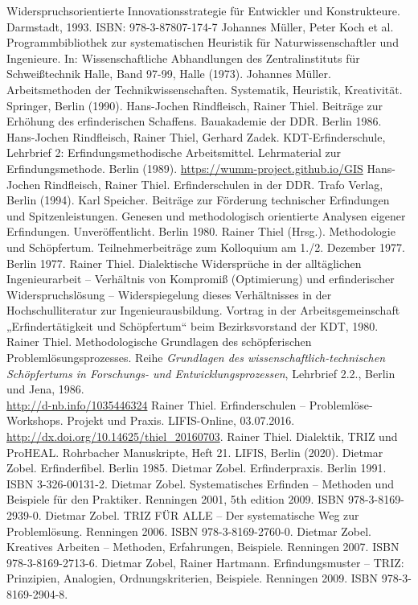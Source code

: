 \documentclass[11pt,a4paper]{article}
\begin{document}
\begin{thebibliography}{xxx}
  Widerspruchsorientierte Innovationsstrategie für Entwickler und
  Konstrukteure.  Darmstadt, 1993.  ISBN: 978-3-87807-174-7
 Johannes Müller, Peter Koch et al. Programmbibliothek
  zur systematischen Heuristik für Naturwissenschaftler und Ingenieure. In:
  Wissenschaftliche Abhandlungen des Zentralinstituts für Schweißtechnik
  Halle, Band 97-99, Halle (1973).
 Johannes Müller. Arbeitsmethoden der
  Technikwissenschaften.  Systematik, Heuristik, Kreativität. Springer, Berlin
  (1990).
 Hans-Jochen Rindfleisch, Rainer Thiel. Beiträge zur Erhöhung
  des erfinderischen Schaffens. Bauakademie der DDR. Berlin 1986.
 Hans-Jochen Rindfleisch, Rainer Thiel, Gerhard Zadek.
  KDT-Erfinderschule, Lehrbrief 2: Erfindungs­methodische Arbeitsmittel.
  Lehrmaterial zur Erfindungsmethode. Berlin (1989).
  \url{https://wumm-project.github.io/GIS}
 Hans-Jochen Rindfleisch, Rainer Thiel. Erfinderschulen in der
  DDR. Trafo Verlag, Berlin (1994).
 Karl Speicher. Beiträge zur Förderung technischer
  Erfindungen und Spitzenleistungen. Genesen und methodologisch orientierte
  Analysen eigener Erfindungen. Unveröffentlicht. Berlin 1980.
 Rainer Thiel (Hrsg.). Methodologie und Schöpfertum.
  Teilnehmerbeiträge zum Kolloquium am 1./2. Dezember 1977. Berlin 1977.
 Rainer Thiel. Dialektische Widersprüche in der
  alltäglichen Ingenieurarbeit -- Verhältnis von Kompromiß (Optimierung) und
  erfinderischer Widerspruchslösung -- Widerspiegelung dieses Verhältnisses in
  der Hochschulliteratur zur Ingenieurausbildung. Vortrag in der
  Arbeitsgemeinschaft „Erfindertätigkeit und Schöpfertum“ beim Bezirksvorstand
  der KDT, 1980.
 Rainer Thiel.  Methodologische Grundlagen des
  schöpferischen Problemlösungsprozesses. Reihe \emph{Grundlagen des
    wissen\-schaft\-lich-technischen Schöpfertums in Forschungs- und
    Entwicklungsprozessen}, Lehrbrief 2.2., Berlin und Jena, 1986.\\
    \url{http://d-nb.info/1035446324} 
 Rainer Thiel.  Erfinderschulen – Problemlöse-Workshops.
  Projekt und Praxis. LIFIS-Online, 03.07.2016.
  \url{http://dx.doi.org/10.14625/thiel_20160703}.
 Rainer Thiel.  Dialektik, TRIZ und ProHEAL. Rohrbacher
   Manuskripte, Heft 21. LIFIS, Berlin (2020).
 Dietmar Zobel. Erfinderfibel. Berlin 1985.
 Dietmar Zobel. Erfinderpraxis. Berlin 1991. ISBN
  3-326-00131-2.
 Dietmar Zobel. Systematisches Erfinden -- Methoden und
  Beispiele für den Praktiker. Renningen 2001, 5th edition 2009. ISBN
  978-3-8169-2939-0.
 Dietmar Zobel. TRIZ FÜR ALLE -- Der systematische Weg zur
  Problemlösung. Renningen 2006. ISBN 978-3-8169-2760-0.
 Dietmar Zobel. Kreatives Arbeiten – Methoden, Erfahrungen,
  Beispiele.  Renningen 2007. ISBN 978-3-8169-2713-6. 
 Dietmar Zobel, Rainer Hartmann. Erfindungsmuster -- TRIZ:
  Prinzipien, Analogien, Ordnungskriterien, Beispiele.  Renningen 2009. ISBN
  978-3-8169-2904-8.
\end{thebibliography}
\end{document}
